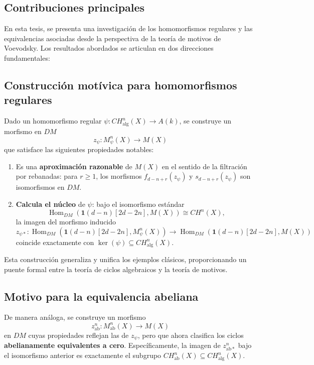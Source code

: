 \documentclass[10pt]{amsart}
\theoremstyle{definition}
\theoremstyle{remark}
\theoremstyle{definition}
\begin{document}
\subsection{Contribuciones principales}

En esta tesis, se presenta una investigación de los homomorfismos regulares y las equivalencias asociadas desde la perspectiva de la teoría de motivos de Voevodsky. Los resultados abordados se articulan en dos direcciones fundamentales:

\subsection{Construcción motívica para homomorfismos regulares}

Dado un homomorfismo regular $\psi: CH^{n}_{\mathrm{alg}}(X) \to A(k)$, se construye un morfismo en $DM$
\[
z_\psi: M^n_{\psi}(X) \to M(X)
\]
que satisface las siguientes propiedades notables:

\begin{enumerate}
    \item Es una \textbf{aproximación razonable} de $M(X)$ en el sentido de la filtración por rebanadas: para $r \geq 1$, los morfismos $f_{d-n+r}(z_\psi)$ y $s_{d-n+r}(z_\psi)$ son isomorfismos en $DM$.
    \item \textbf{Calcula el núcleo} de $\psi$: bajo el isomorfismo estándar
    \[
    \operatorname{Hom}_{DM}(\mathbf{1}(d-n)[2d-2n], M(X)) \cong CH^n(X),
    \]
    la imagen del morfismo inducido
    \[
    z_{\psi*}: \operatorname{Hom}_{DM}(\mathbf{1}(d-n)[2d-2n], M^{n}_{\psi}(X)) \to \operatorname{Hom}_{DM}(\mathbf{1}(d-n)[2d-2n], M(X))
    \]
    coincide exactamente con $\ker(\psi) \subseteq CH^{n}_{\mathrm{alg}}(X)$.
\end{enumerate}

Esta construcción generaliza y unifica los ejemplos clásicos, proporcionando un puente formal entre la teoría de ciclos algebraicos y la teoría de motivos.

\subsection{Motivo para la equivalencia abeliana}

De manera análoga, se construye un morfismo
\[
z^n_{\mathrm{ab}}: M^{n}_{\mathrm{ab}}(X) \to M(X)
\]
en $DM$ cuyas propiedades reflejan las de $z_\psi$, pero que ahora clasifica los ciclos \textbf{abelianamente equivalentes a cero}. Específicamente, la imagen de $z^n_{\mathrm{ab}*}$ bajo el isomorfismo anterior es exactamente el subgrupo $CH^{n}_{\mathrm{ab}}(X) \subseteq CH^{n}_{\mathrm{alg}}(X)$.
\end{document}
